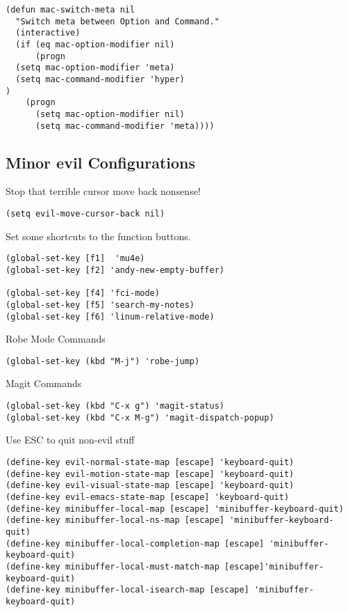 \documentclass{article}
\begin{document}
\begin{verbatim}
(defun mac-switch-meta nil
  "Switch meta between Option and Command."
  (interactive)
  (if (eq mac-option-modifier nil)
      (progn
  (setq mac-option-modifier 'meta)
  (setq mac-command-modifier 'hyper)
)
    (progn
      (setq mac-option-modifier nil)
      (setq mac-command-modifier 'meta))))
\end{verbatim}


\subsection{Minor evil Configurations}
\label{sec-7-6}

Stop that terrible cursor move back nonsense!

\begin{verbatim}
(setq evil-move-cursor-back nil)
\end{verbatim}

Set some shortcuts to the function buttons.

\begin{verbatim}
(global-set-key [f1]  'mu4e)
(global-set-key [f2] 'andy-new-empty-buffer)

(global-set-key [f4] 'fci-mode)
(global-set-key [f5] 'search-my-notes)
(global-set-key [f6] 'linum-relative-mode)
\end{verbatim}

Robe Mode Commands

\begin{verbatim}
(global-set-key (kbd "M-j") 'robe-jump)
\end{verbatim}

Magit Commands

\begin{verbatim}
(global-set-key (kbd "C-x g") 'magit-status)
(global-set-key (kbd "C-x M-g") 'magit-dispatch-popup)
\end{verbatim}

Use ESC to quit non-evil stuff

\begin{verbatim}
(define-key evil-normal-state-map [escape] 'keyboard-quit)
(define-key evil-motion-state-map [escape] 'keyboard-quit)
(define-key evil-visual-state-map [escape] 'keyboard-quit)
(define-key evil-emacs-state-map [escape] 'keyboard-quit)
(define-key minibuffer-local-map [escape] 'minibuffer-keyboard-quit)
(define-key minibuffer-local-ns-map [escape] 'minibuffer-keyboard-quit)
(define-key minibuffer-local-completion-map [escape] 'minibuffer-keyboard-quit)
(define-key minibuffer-local-must-match-map [escape]'minibuffer-keyboard-quit)
(define-key minibuffer-local-isearch-map [escape] 'minibuffer-keyboard-quit)
\end{verbatim}
\end{document}
